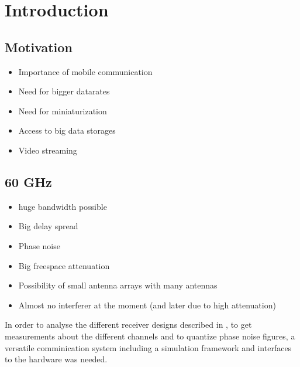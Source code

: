 \chapter{Introduction}
\label{ch:introduction}

\section{Motivation}
\begin{itemize}
\item Importance of mobile communication
\item Need for bigger datarates
\item Need for miniaturization
\item Access to big data storages
\item Video streaming
\end{itemize}

\section{60 GHz}
\begin{itemize}
\item huge bandwidth possible
\item Big delay spread
\item Phase noise
\item Big freespace attenuation
\item Possibility of small antenna arrays with many antennas
\item Almost no interferer at the moment (and later due to high attenuation)
\end{itemize}

In order to analyse the different receiver designs described in
, to get measurements about the different channels
and to quantize phase noise figures, a versatile comminication system
including a simulation framework and interfaces to the hardware
was needed. \\

